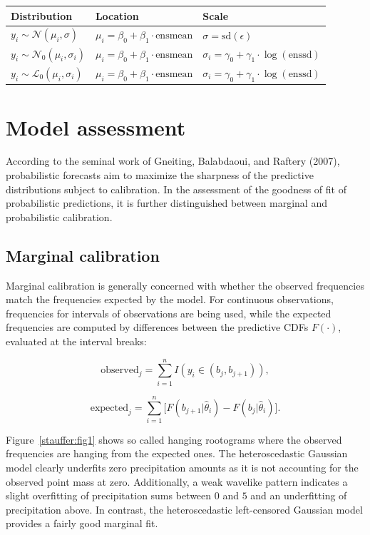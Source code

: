 \documentclass[twoside]{report}
\begin{document}
\begin{table}[!ht]\centering
    \begin{tabular}{lll}
         Distribution                              & Location                                         & Scale \\
        \midrule[0.09 em]
        $y_i \sim \mathcal{N}(\mu_i, \sigma)$     & $\mu_i = \beta_0 + \beta_1 \cdot \text{ensmean}$ & $\sigma = \text{sd}(\epsilon)$ \\
        $y_i \sim \mathcal{N}_0(\mu_i, \sigma_i)$ & $\mu_i = \beta_0 + \beta_1 \cdot \text{ensmean}$ & $\sigma_i = \gamma_0 + \gamma_1 \cdot \log(\text{enssd})$ \\
        $y_i \sim \mathcal{L}_0(\mu_i, \sigma_i)$ & $\mu_i = \beta_0 + \beta_1 \cdot \text{ensmean}$ & $\sigma_i = \gamma_0 + \gamma_1 \cdot \log(\text{enssd})$ \\
        \bottomrule[0.09 em]
    \end{tabular}
\end{table}


\section{Model assessment}

According to the seminal work of Gneiting, Balabdaoui, and Raftery (2007),
probabilistic forecasts aim to maximize the sharpness of the predictive
distributions subject to calibration. 
In the assessment of the goodness of fit of probabilistic predictions,
it is further distinguished between marginal and probabilistic calibration.

\subsection{Marginal calibration}


Marginal calibration is generally concerned with whether the observed
frequencies match the frequencies expected by the model.  For continuous
observations, frequencies for intervals of observations are being used, while
the expected frequencies are computed by differences between the predictive
CDFs $F(\cdot)$, evaluated at the interval breaks:


$$
\text{observed}_j = \sum_{i=1}^n I(y_i \in (b_j, b_{j+1})),
$$

$$
\text{expected}_j = \sum_{i=1}^n \big[ F(b_{j+1} | \hat{\theta}_i) - F(b_{j} | \hat{\theta}_i) \big].
$$

Figure~\ref{stauffer:fig1} shows so called hanging rootograms where the
observed frequencies are hanging from the expected ones. The heteroscedastic
Gaussian model clearly underfits zero precipitation amounts as it is not
accounting for the observed point mass at zero.  Additionally, a weak wavelike
pattern indicates a slight overfitting of precipitation sums between $0$ and
$5$ and an underfitting of precipitation above. In contrast, the
heteroscedastic left-censored Gaussian model provides a fairly good marginal fit.
\end{document}
